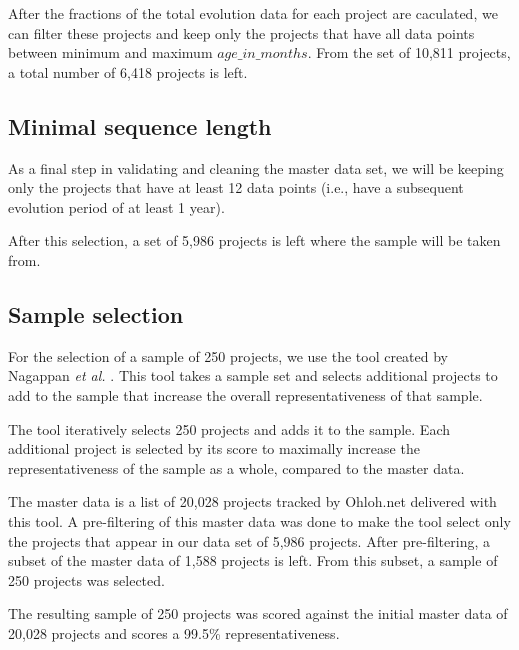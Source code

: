 After the fractions of the total evolution data for each project are caculated,
we can filter these projects and keep only the projects that have all data points
between minimum and maximum $age\_in\_months$. From the set of 10,811 projects,
a total number of 6,418 projects is left.

\subsection{Minimal sequence length}
As a final step in validating and cleaning the master data set, we will be
keeping only the projects that have at least 12 data points (i.e., have a
subsequent evolution period of at least 1 year).

After this selection, a set of 5,986 projects is left where the sample will be
taken from.

\subsection{Sample selection}
For the selection of a sample of 250 projects, we use the tool created by
Nagappan \emph{et al. }\rm\cite{nagappan}. This tool takes a sample set and
selects additional projects to add to the sample that increase the overall
representativeness of that sample.

The tool iteratively selects 250 projects and adds it to the sample. Each
additional project is selected by its score to maximally increase the
representativeness of the sample as a whole, compared to the master data.

The master data is a list of 20,028 projects tracked by Ohloh.net delivered with
this tool. A pre-filtering of this master data was done to make the tool select
only the projects that appear in our data set of 5,986 projects. After
pre-filtering, a subset of the master data of 1,588 projects is left. From this
subset, a sample of 250 projects was selected.

The resulting sample of 250 projects was scored against the initial master data
of 20,028 projects and scores a 99.5\% representativeness.

